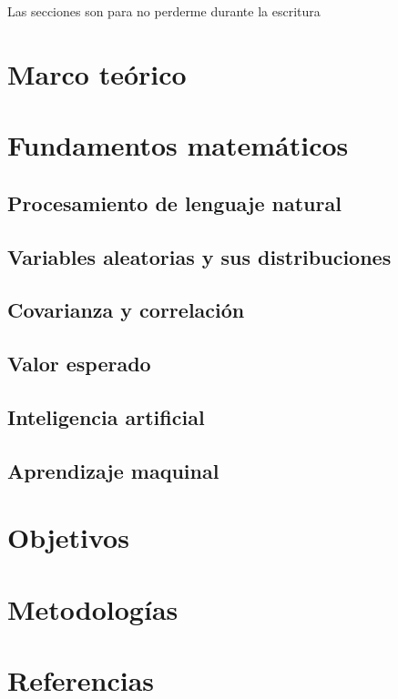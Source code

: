 \documentclass[12pt,letterpaper]{article}
\begin{document}
\maketitle
%
\tableofcontents
\pagebreak
Las secciones son para no perderme durante la escritura
\section {Marco teórico}\label{sec:marco}

\section {Fundamentos matemáticos}\label{sec:mate}
\subsection {Procesamiento de lenguaje natural}\label{subsec:nlp}
\subsection {Variables aleatorias y sus distribuciones}\label{subsec:vayd}
\subsection {Covarianza y correlación}\label{subsec:reg1}
\subsection {Valor esperado}\label{subsec:valesp}
\subsection {Inteligencia artificial}\label{subsec:intela}
\subsection {Aprendizaje maquinal}\label{subsec:machinel}
\section {Objetivos}\label{sec:objetivos}
\section {Metodologías}\label{sec:metod}
\section {Referencias}\label{sec:refs}
\printbibliography[heading=none]
\end{document}
